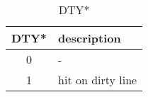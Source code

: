 %
%
\begin{table}[htbp]
\caption{DTY*}\label{tbl:dty}
   \begin{center}
   \begin{tabular}{|c|l|} \hline
      DTY* & description \\ \hline \hline
      0    & - \\ \hline
      1    & hit on dirty line \\ \hline
   \end{tabular}
   \end{center}
\end{table}
%
%
